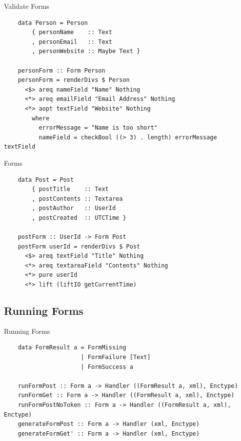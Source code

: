 \documentclass[pdf]{beamer}
\begin{document}
\begin{frame}[fragile]{Validate Forms}
  \begin{verbatim}
    data Person = Person
        { personName    :: Text
        , personEmail   :: Text
        , personWebsite :: Maybe Text }

    personForm :: Form Person
    personForm = renderDivs $ Person
      <$> areq nameField "Name" Nothing
      <*> areq emailField "Email Address" Nothing
      <*> aopt textField "Website" Nothing
        where
          errorMessage = "Name is too short"
          nameField = checkBool ((> 3) . length) errorMessage textField
  \end{verbatim}
\end{frame}

\begin{frame}[fragile]{Forms}
  \begin{verbatim}
    data Post = Post
        { postTitle    :: Text
        , postContents :: Textarea
        , postAuthor   :: UserId
        , postCreated  :: UTCTime }

    postForm :: UserId -> Form Post
    postForm userId = renderDivs $ Post
      <$> areq textField "Title" Nothing
      <*> areq textareaField "Contents" Nothing
      <*> pure userId
      <*> lift (liftIO getCurrentTime)
  \end{verbatim}
\end{frame}

\subsection{Running Forms}
\begin{frame}[fragile]{Running Forms}
  \begin{verbatim}
    data FormResult a = FormMissing
                      | FormFailure [Text]
                      | FormSuccess a
    
    runFormPost :: Form a -> Handler ((FormResult a, xml), Enctype)
    runFormGet :: Form a -> Handler ((FormResult a, xml), Enctype)
    runFormPostNoToken :: Form a -> Handler ((FormResult a, xml), Enctype)
    generateFormPost :: Form a -> Handler (xml, Enctype)
    generateFormGet' :: Form a -> Handler (xml, Enctype)
  \end{verbatim}
\end{frame}
\end{document}
